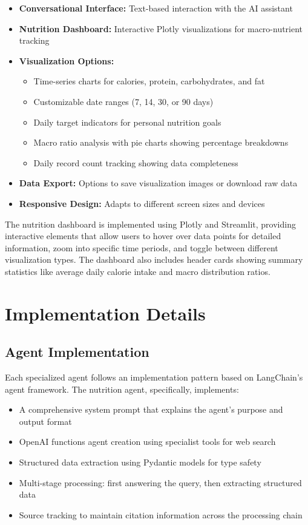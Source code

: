 \documentclass{ecai}
\begin{document}
\begin{itemize}[noitemsep,topsep=0pt]
    \item \textbf{Conversational Interface:} Text-based interaction with the AI assistant
    \item \textbf{Nutrition Dashboard:} Interactive Plotly visualizations for macro-nutrient tracking
    \item \textbf{Visualization Options:}
    \begin{itemize}[noitemsep,topsep=0pt]
        \item Time-series charts for calories, protein, carbohydrates, and fat
        \item Customizable date ranges (7, 14, 30, or 90 days)
        \item Daily target indicators for personal nutrition goals
        \item Macro ratio analysis with pie charts showing percentage breakdowns
        \item Daily record count tracking showing data completeness
    \end{itemize}
    \item \textbf{Data Export:} Options to save visualization images or download raw data
    \item \textbf{Responsive Design:} Adapts to different screen sizes and devices
\end{itemize}

The nutrition dashboard is implemented using Plotly and Streamlit, providing interactive elements that allow users to hover over data points for detailed information, zoom into specific time periods, and toggle between different visualization types. The dashboard also includes header cards showing summary statistics like average daily calorie intake and macro distribution ratios.

\section{Implementation Details}

\subsection{Agent Implementation}

Each specialized agent follows an implementation pattern based on LangChain's agent framework. The nutrition agent, specifically, implements:

\begin{itemize}[noitemsep,topsep=0pt]
    \item A comprehensive system prompt that explains the agent's purpose and output format
    \item OpenAI functions agent creation using specialist tools for web search
    \item Structured data extraction using Pydantic models for type safety
    \item Multi-stage processing: first answering the query, then extracting structured data
    \item Source tracking to maintain citation information across the processing chain
\end{itemize}
\end{document}
